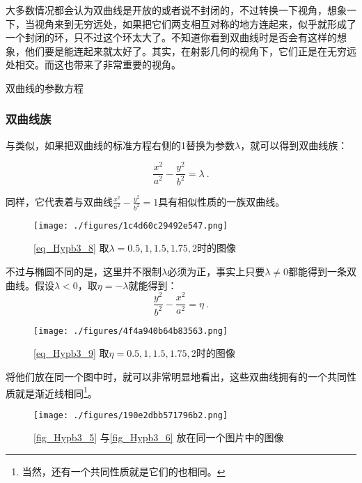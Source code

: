 大多数情况都会认为双曲线是开放的或者说不封闭的，不过转换一下视角，想象一下，当视角来到无穷远处，如果把它们两支相互对称的地方连起来，似乎就形成了一个封闭的环，只不过这个环太大了。不知道你看到双曲线时是否会有这样的想象，他们要是能连起来就太好了。其实，在射影几何的视角下，它们正是在无穷远处相交。而这也带来了非常重要的视角。

\begin{theorem}{双曲线的参数方程}

\end{theorem}
\subsubsection{双曲线族}

与类似，如果把双曲线的标准方程右侧的1替换为参数$\lambda$，就可以得到双曲线族：

\begin{equation}\label{eq_Hypb3_8}
\frac{x^2}{a^2} - \frac{y^2}{b^2} = \lambda~.
\end{equation}

同样，它代表着与双曲线$\displaystyle\frac{x^2}{a^2} - \frac{y^2}{b^2} = 1$具有相似性质的一族双曲线。

\begin{figure}[ht]
\centering
\texttt{[image: ./figures/1c4d60c29492e547.png]}
\caption{\autoref{eq_Hypb3_8} 取$\lambda=0.5,1,1.5,1.75,2$时的图像} \label{fig_Hypb3_5}
\end{figure}


不过与椭圆不同的是，这里并不限制$\lambda$必须为正，事实上只要$\lambda\neq0$都能得到一条双曲线。假设$\lambda<0$，取$\eta=-\lambda$就能得到：
\begin{equation}\label{eq_Hypb3_9}
\frac{y^2}{b^2}-\frac{x^2}{a^2} = \eta~.
\end{equation}
\begin{figure}[ht]
\centering
\texttt{[image: ./figures/4f4a940b64b83563.png]}
\caption{\autoref{eq_Hypb3_9} 取$\eta=0.5,1,1.5,1.75,2$时的图像} \label{fig_Hypb3_6}
\end{figure}

将他们放在同一个图中时，就可以非常明显地看出，这些双曲线拥有的一个共同性质就是渐近线相同\footnote{当然，还有一个共同性质就是它们的也相同。}。

\begin{figure}[ht]
\centering
\texttt{[image: ./figures/190e2dbb571796b2.png]}
\caption{\autoref{fig_Hypb3_5} 与\autoref{fig_Hypb3_6} 放在同一个图片中的图像} \label{fig_Hypb3_7}
\end{figure}
